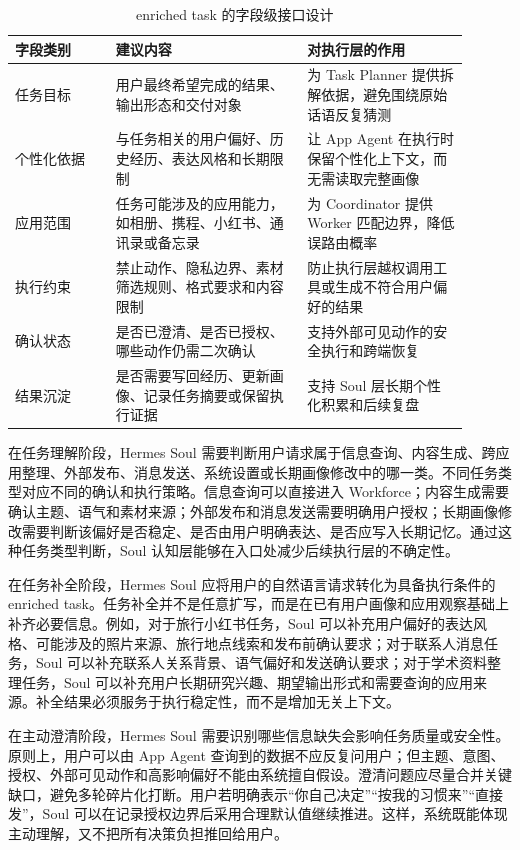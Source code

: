 \begin{table}[h]
\centering
\begin{tabular}{p{0.20\linewidth}p{0.38\linewidth}p{0.32\linewidth}}
\hline
\textbf{字段类别} & \textbf{建议内容} & \textbf{对执行层的作用} \\
\hline
任务目标 & 用户最终希望完成的结果、输出形态和交付对象 & 为 Task Planner 提供拆解依据，避免围绕原始话语反复猜测 \\
个性化依据 & 与任务相关的用户偏好、历史经历、表达风格和长期限制 & 让 App Agent 在执行时保留个性化上下文，而无需读取完整画像 \\
应用范围 & 任务可能涉及的应用能力，如相册、携程、小红书、通讯录或备忘录 & 为 Coordinator 提供 Worker 匹配边界，降低误路由概率 \\
执行约束 & 禁止动作、隐私边界、素材筛选规则、格式要求和内容限制 & 防止执行层越权调用工具或生成不符合用户偏好的结果 \\
确认状态 & 是否已澄清、是否已授权、哪些动作仍需二次确认 & 支持外部可见动作的安全执行和跨端恢复 \\
结果沉淀 & 是否需要写回经历、更新画像、记录任务摘要或保留执行证据 & 支持 Soul 层长期个性化积累和后续复盘 \\
\hline
\end{tabular}
\caption{enriched task 的字段级接口设计}
\label{tab:rt3-enriched-task-fields}
\end{table}

在任务理解阶段，Hermes Soul 需要判断用户请求属于信息查询、内容生成、跨应用整理、外部发布、消息发送、系统设置或长期画像修改中的哪一类。不同任务类型对应不同的确认和执行策略。信息查询可以直接进入 Workforce；内容生成需要确认主题、语气和素材来源；外部发布和消息发送需要明确用户授权；长期画像修改需要判断该偏好是否稳定、是否由用户明确表达、是否应写入长期记忆。通过这种任务类型判断，Soul 认知层能够在入口处减少后续执行层的不确定性。

在任务补全阶段，Hermes Soul 应将用户的自然语言请求转化为具备执行条件的 enriched task。任务补全并不是任意扩写，而是在已有用户画像和应用观察基础上补齐必要信息。例如，对于旅行小红书任务，Soul 可以补充用户偏好的表达风格、可能涉及的照片来源、旅行地点线索和发布前确认要求；对于联系人消息任务，Soul 可以补充联系人关系背景、语气偏好和发送确认要求；对于学术资料整理任务，Soul 可以补充用户长期研究兴趣、期望输出形式和需要查询的应用来源。补全结果必须服务于执行稳定性，而不是增加无关上下文。

在主动澄清阶段，Hermes Soul 需要识别哪些信息缺失会影响任务质量或安全性。原则上，用户可以由 App Agent 查询到的数据不应反复问用户；但主题、意图、授权、外部可见动作和高影响偏好不能由系统擅自假设。澄清问题应尽量合并关键缺口，避免多轮碎片化打断。用户若明确表示“你自己决定”“按我的习惯来”“直接发”，Soul 可以在记录授权边界后采用合理默认值继续推进。这样，系统既能体现主动理解，又不把所有决策负担推回给用户。


